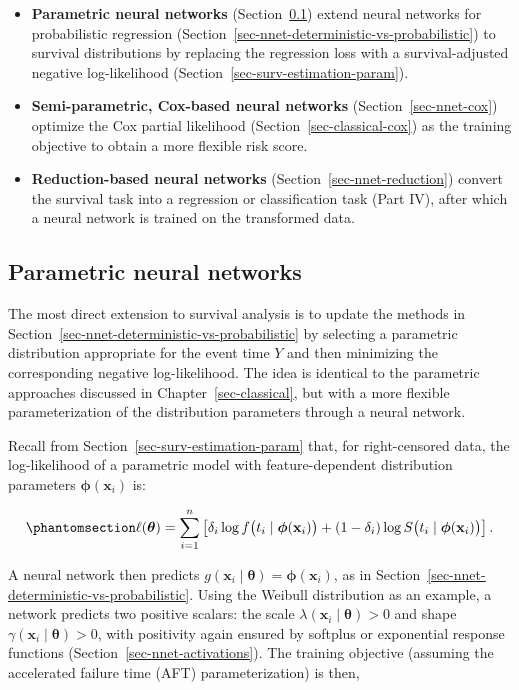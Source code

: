 \documentclass[
  letterpaper,
  krantz2]{style/krantz}
\providecommand{\tightlist}{%
  \setlength{\itemsep}{0pt}\setlength{\parskip}{0pt}}
\begin{document}
\begin{itemize}
\tightlist
\item
  \textbf{Parametric neural networks} (Section~\ref{sec-nnet-param})
  extend neural networks for probabilistic regression
  (Section~\ref{sec-nnet-deterministic-vs-probabilistic}) to survival
  distributions by replacing the regression loss with a
  survival-adjusted negative log-likelihood
  (Section~\ref{sec-surv-estimation-param}).
\item
  \textbf{Semi-parametric, Cox-based neural networks}
  (Section~\ref{sec-nnet-cox}) optimize the Cox partial likelihood
  (Section~\ref{sec-classical-cox}) as the training objective to obtain
  a more flexible risk score.
\item
  \textbf{Reduction-based neural networks}
  (Section~\ref{sec-nnet-reduction}) convert the survival task into a
  regression or classification task (Part IV), after which a neural
  network is trained on the transformed data.
\end{itemize}

\subsection{Parametric neural networks}\label{sec-nnet-param}

The most direct extension to survival analysis is to update the methods
in Section~\ref{sec-nnet-deterministic-vs-probabilistic} by selecting a
parametric distribution appropriate for the event time \(Y\) and then
minimizing the corresponding negative log-likelihood.
 The idea is
identical to the parametric approaches discussed in
Chapter~\ref{sec-classical}, but with a more flexible parameterization
of the distribution parameters through a neural network.

Recall from Section~\ref{sec-surv-estimation-param} that, for
right-censored data, the log-likelihood of a parametric model with
feature-dependent distribution parameters
\(\boldsymbol{\phi}(\mathbf{x}_i)\) is:

\begin{equation}\phantomsection\label{eq-nnet-param-lik}{
\ell(\boldsymbol{\theta}) = \sum_{i=1}^{n} \left[\delta_i \log f\bigl(t_i \mid \boldsymbol{\phi}(\mathbf{x}_i)\bigr) + (1 - \delta_i) \log S\bigl(t_i \mid \boldsymbol{\phi}(\mathbf{x}_i)\bigr)\right].
}\end{equation}

A neural network then predicts
\(g(\mathbf{x}_i \mid \boldsymbol{\theta}) = \boldsymbol{\phi}(\mathbf{x}_i)\),
as in Section~\ref{sec-nnet-deterministic-vs-probabilistic}. Using the
Weibull distribution as an example, a
network predicts two positive scalars: the scale
\(\lambda(\mathbf{x}_i \mid \boldsymbol{\theta}) > 0\) and shape
\(\gamma(\mathbf{x}_i \mid \boldsymbol{\theta}) > 0\), with positivity
again ensured by softplus or exponential response functions
(Section~\ref{sec-nnet-activations}). The training objective (assuming
the accelerated failure time (AFT)
parameterization) is then,
\end{document}
